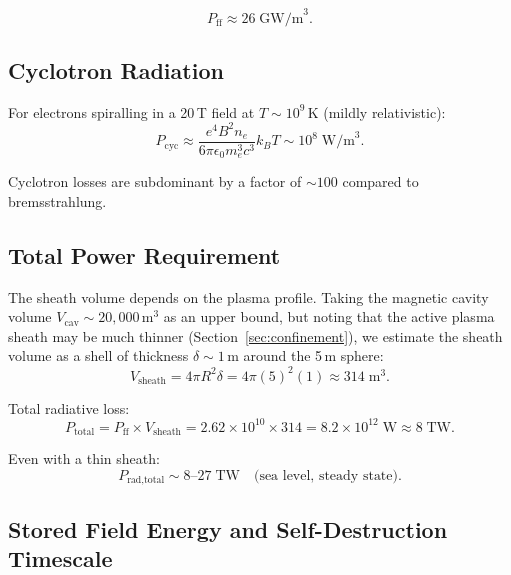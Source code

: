 \documentclass[12pt,a4paper]{article}
\begin{document}
\begin{equation}
  \boxed{P_{\text{ff}} \approx 26 \; \text{GW/m}^3.}
\end{equation}

\subsection{Cyclotron Radiation}

For electrons spiralling in a 20\,T field at $T \sim 10^9$\,K (mildly relativistic):
\begin{equation}
  P_{\text{cyc}} \approx \frac{e^4 B^2 n_e}{6\pi \epsilon_0 m_e^3 c^3} k_B T
    \sim 10^{8} \; \text{W/m}^3.
\end{equation}

Cyclotron losses are subdominant by a factor of $\sim 100$ compared to bremsstrahlung.

\subsection{Total Power Requirement}

The sheath volume depends on the plasma profile.  Taking the magnetic cavity volume
$V_{\text{cav}} \sim 20{,}000$\,m$^3$ as an upper bound, but noting that the active
plasma sheath may be much thinner (Section~\ref{sec:confinement}), we estimate the
sheath volume as a shell of thickness $\delta \sim 1$\,m around the 5\,m sphere:
\begin{equation}
  V_{\text{sheath}} = 4\pi R^2 \delta = 4\pi (5)^2 (1) \approx 314 \; \text{m}^3.
\end{equation}

Total radiative loss:
\begin{equation}
  P_{\text{total}} = P_{\text{ff}} \times V_{\text{sheath}}
    = 2.62\times10^{10} \times 314
    = 8.2 \times 10^{12} \; \text{W}
    \approx 8 \; \text{TW}.
\end{equation}

Even with a thin sheath:
\begin{equation}
  \boxed{P_{\text{rad,total}} \sim 8\text{--}27 \; \text{TW} \quad \text{(sea level, steady state).}}
\end{equation}

\subsection{Stored Field Energy and Self-Destruction Timescale}
\end{document}
